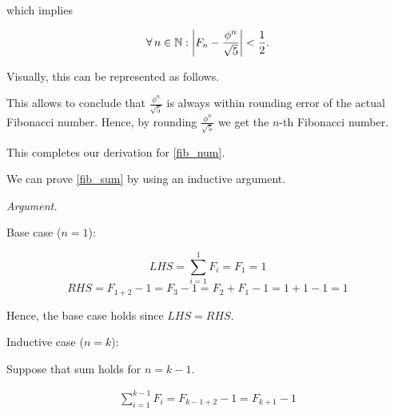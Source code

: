 \documentclass{uom-coursework}
\begin{document}
which implies

\begin{align*}
  \forall \, n \in \mathbb{N} : \left\lvert F_n -
  \frac{\phi^n}{\sqrt{5}} \right\rvert < \frac{1}{2}.
\end{align*}

Visually, this can be represented as follows.

\begin{center}
\end{center}

This allows to conclude that $\frac{\phi^n}{\sqrt{5}}$ is always
within rounding error of the actual Fibonacci number. Hence, by
rounding $\frac{\phi^n}{\sqrt{5}}$ we get the $n$-th Fibonacci
number.

This completes our derivation for \ref{fib_num}.

\vspace{1em}

We can prove \ref{fib_sum} by using an inductive argument.

\vspace{1em}

\textit{Argument.}

Base case ($n = 1$): 

$$LHS = \sum_{i = 1}^{1} F_i = F_1 = 1$$ 
$$RHS = F_{1 + 2} - 1 = F_3 - 1 = F_2 + F_1 - 1 = 1 + 1 - 1 =
1$$

Hence, the base case holds since $LHS = RHS$.

\vspace{1em}

Inductive case ($n = k$):

Suppose that sum holds for $n = k - 1$. 

\begin{align}
  \sum_{i = 1}^{k - 1} F_i = F_{k - 1 + 2} - 1 = F_{k + 1} - 1
  \label{ind_hyp}
\end{align}
\end{document}
